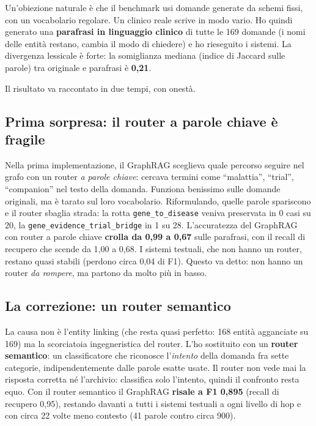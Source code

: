 \documentclass[11pt,a4paper]{report}
\begin{document}
Un'obiezione naturale è che il benchmark usi domande generate da schemi
fissi, con un vocabolario regolare. Un clinico reale scrive in modo vario.
Ho quindi generato una \textbf{parafrasi in linguaggio clinico} di tutte le
169 domande (i nomi delle entità restano, cambia il modo di chiedere) e ho
rieseguito i sistemi. La divergenza lessicale è forte: la somiglianza
mediana (indice di Jaccard sulle parole) tra originale e parafrasi è
\textbf{0,21}.

Il risultato va raccontato in due tempi, con onestà.

\subsection{Prima sorpresa: il router a parole chiave è fragile}

Nella prima implementazione, il GraphRAG sceglieva quale percorso seguire
nel grafo con un router \emph{a parole chiave}: cercava termini come
``malattia'', ``trial'', ``companion'' nel testo della domanda. Funziona
benissimo sulle domande originali, ma è tarato sul loro vocabolario.
Riformulando, quelle parole spariscono e il router sbaglia strada: la
rotta \texttt{gene\_to\_disease} veniva preservata in 0 casi su 20, la
\texttt{gene\_evidence\_trial\_bridge} in 1 su 28. L'accuratezza del
GraphRAG con router a parole chiave \textbf{crolla da 0,99 a 0,67} sulle
parafrasi, con il recall di recupero che scende da 1,00 a 0,68. I sistemi
testuali, che non hanno un router, restano quasi stabili (perdono circa
0,04 di F1). Questo va detto: non hanno un router \emph{da rompere}, ma
partono da molto più in basso.

\subsection{La correzione: un router semantico}

La causa non è l'entity linking (che resta quasi perfetto: 168 entità
agganciate su 169) ma la scorciatoia ingegneristica del router. L'ho
sostituito con un \textbf{router semantico}: un classificatore che riconosce
l'\emph{intento} della domanda fra sette categorie, indipendentemente dalle
parole esatte usate. Il router non vede mai la risposta corretta né
l'archivio: classifica solo l'intento, quindi il confronto resta equo.
Con il router semantico il GraphRAG \textbf{risale a F1 0,895} (recall di
recupero 0,95), restando davanti a tutti i sistemi testuali a ogni livello
di hop e con circa 22 volte meno contesto (41 parole contro circa 900).
\end{document}

